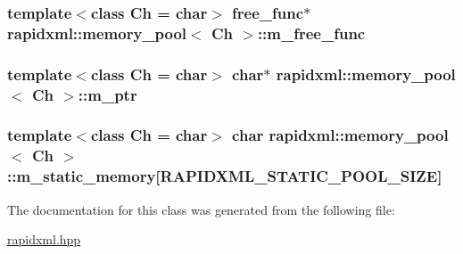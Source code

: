 \subsubsection[{m\+\_\+free\+\_\+func}]{\setlength{\rightskip}{0pt plus 5cm}template$<$class Ch  = char$>$ free\+\_\+func$\ast$ {\bf rapidxml\+::memory\+\_\+pool}$<$ Ch $>$\+::m\+\_\+free\+\_\+func\hspace{0.3cm}{\ttfamily [private]}}\label{classrapidxml_1_1memory__pool_af8f41565f4de167eb2f40ca20695f24d}
\hypertarget{classrapidxml_1_1memory__pool_a4a89ff677c72afc163d1855cefc28013}{}
\subsubsection[{m\+\_\+ptr}]{\setlength{\rightskip}{0pt plus 5cm}template$<$class Ch  = char$>$ char$\ast$ {\bf rapidxml\+::memory\+\_\+pool}$<$ Ch $>$\+::m\+\_\+ptr\hspace{0.3cm}{\ttfamily [private]}}\label{classrapidxml_1_1memory__pool_a4a89ff677c72afc163d1855cefc28013}
\hypertarget{classrapidxml_1_1memory__pool_aacc5ca734ebfbef7f42251764eb396f4}{}
\subsubsection[{m\+\_\+static\+\_\+memory}]{\setlength{\rightskip}{0pt plus 5cm}template$<$class Ch  = char$>$ char {\bf rapidxml\+::memory\+\_\+pool}$<$ Ch $>$\+::m\+\_\+static\+\_\+memory\mbox{[}{\bf R\+A\+P\+I\+D\+X\+M\+L\+\_\+\+S\+T\+A\+T\+I\+C\+\_\+\+P\+O\+O\+L\+\_\+\+S\+I\+Z\+E}\mbox{]}\hspace{0.3cm}{\ttfamily [private]}}\label{classrapidxml_1_1memory__pool_aacc5ca734ebfbef7f42251764eb396f4}


The documentation for this class was generated from the following file\+:\begin{DoxyCompactItemize}
\item 
\hyperlink{rapidxml_8hpp}{rapidxml.\+hpp}\end{DoxyCompactItemize}
